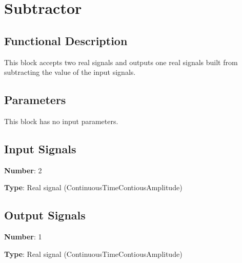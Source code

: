 \section{Subtractor}

\subsection*{Functional Description}

This block accepts two real signals and outputs one real signals built from subtracting the value of the input signals.

\subsection*{Parameters}

This block has no input parameters.

\subsection*{Input Signals}

\textbf{Number}: 2

\textbf{Type}: Real signal (ContinuousTimeContiousAmplitude)

\subsection*{Output Signals}

\textbf{Number}: 1

\textbf{Type}: Real signal (ContinuousTimeContiousAmplitude)